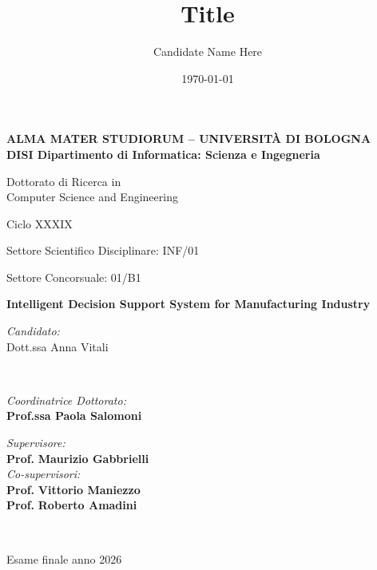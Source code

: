 \title{Title}
\author{Candidate Name Here}
\date{\today}

\begin{titlepage}
	\begin{center}

		\large
		\textbf{ALMA MATER STUDIORUM -- UNIVERSITÀ DI BOLOGNA \\ DISI Dipartimento di Informatica: Scienza e Ingegneria}
		\\
		\noindent\hrulefill
		\vspace{0.4cm}

		\Large
		Dottorato di Ricerca in \\
		Computer Science and Engineering

		\vspace{0.4cm}

		Ciclo XXXIX

		\vspace{0.4cm}

		Settore Scientifico Disciplinare: INF/01

		Settore Concorsuale: 01/B1

		\Huge
		\vspace{3cm}
		\textbf{
			Intelligent Decision Support System for Manufacturing Industry
		}

		{\Large{
		\vspace{3cm}

		\textit{Candidato:\\}
		\centering
		Dott.ssa Anna Vitali}
		\\}
		\large
		\vspace{2.5cm}
		\begin{minipage}[t]{0.64\textwidth}
			\begin{flushleft}
				\textit{Coordinatrice Dottorato:}
				\\
				\textbf{Prof.ssa Paola Salomoni}
			\end{flushleft}
		\end{minipage}
		\begin{minipage}[t]{0.34\textwidth}
			\begin{flushright}
				\textit{Supervisore:}
				\\
				\textbf{Prof.} \textbf{Maurizio Gabbrielli}
				\\
				\vspace{0.4cm}
				\textit{Co-supervisori:}
				\\
				\textbf{Prof.} \textbf{Vittorio Maniezzo}
				\\
				\textbf{Prof.} \textbf{Roberto Amadini}
			\end{flushright}

		\end{minipage}\\

		\vfill
		\noindent\hrulefill
		\vspace{0.3cm}
		\Large

		Esame finale anno 2026
	\end{center}
\end{titlepage}
\restoregeometry